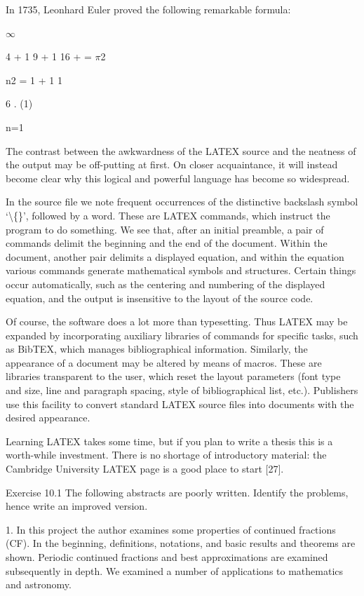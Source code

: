 \documentclass[11pt]{article}
\theoremstyle{plain}
\theoremstyle{definition}
\begin{document}
In 1735, Leonhard Euler proved the following remarkable formula:

$\infty$

4 + 1 9 + 1 16 + \textperiodcentered{} \textperiodcentered{} \textperiodcentered{} = $\pi$2

n2 = 1 + 1 1

6 . (1)

n=1

The contrast between the awkwardness of the LATEX source and the neatness of the output may be off-putting at first. On closer acquaintance, it will instead become clear why this logical and powerful language has become so widespread.

In the source file we note frequent occurrences of the distinctive backslash symbol `\textbackslash\{\}', followed by a word. These are LATEX commands, which instruct the program to do something. We see that, after an initial preamble, a pair of commands delimit the beginning and the end of the document. Within the document, another pair delimits a displayed equation, and within the equation various commands generate mathematical symbols and structures. Certain things occur automatically, such as the centering and numbering of the displayed equation, and the output is insensitive to the layout of the source code.

Of course, the software does a lot more than typesetting. Thus LATEX may be expanded by incorporating auxiliary libraries of commands for specific tasks, such as BibTEX, which manages bibliographical information. Similarly, the appearance of a document may be altered by means of macros. These are libraries transparent to the user, which reset the layout parameters (font type and size, line and paragraph spacing, style of bibliographical list, etc.). Publishers use this facility to convert standard LATEX source files into documents with the desired appearance.

Learning LATEX takes some time, but if you plan to write a thesis this is a worth-while investment. There is no shortage of introductory material: the Cambridge University LATEX page is a good place to start [27].

Exercise 10.1 The following abstracts are poorly written. Identify the problems, hence write an improved version.

1. In this project the author examines some properties of continued fractions (CF). In the beginning, definitions, notations, and basic results and theorems are shown. Periodic continued fractions and best approximations are examined subsequently in depth. We examined a number of applications to mathematics and astronomy.
\end{document}
